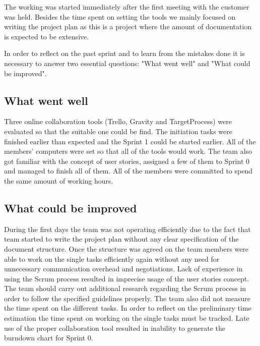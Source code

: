 The working was started immediately after the first meeting with the customer was held. Besides the time spent on setting the tools we mainly focused on writing the project plan as this is a project where the amount of documentation is expected to be extensive. 

In order to reflect on the past sprint and to learn from the mistakes done it is necessary to answer two essential questions: "What went well" and "What could be improved".

\subsection{What went well}
Three online collaboration tools (Trello, Gravity and TargetProcess) were evaluated so that the suitable one could be find. The initiation tasks were finished earlier than expected and the Sprint 1 could be started earlier. All of the members' computers were set so that all of the tools would work. The team also got familiar with the concept of user stories, assigned a few of them to Sprint 0 and managed to finish all of them. All of the members were committed to spend the same amount of working hours.

\subsection{What could be improved}
During the first days the team was not operating efficiently due to the fact that team started to write the project plan without any clear specification of the document structure. Once the structure was agreed on the team members were able to work on the single tasks efficiently again without any need for unnecessary communication overhead and negotiations. Lack of experience in using the Scrum process resulted in imprecise usage of the user stories concept. The team should carry out additional research regarding the Scrum process in order to follow the specified guidelines properly. The team also did not measure the time spent on the different tasks. In order to reflect on the preliminary time estimation the time spent on working on the single tasks must be tracked. Late use of the proper collaboration tool resulted in inability to generate the burndown chart for Sprint 0.